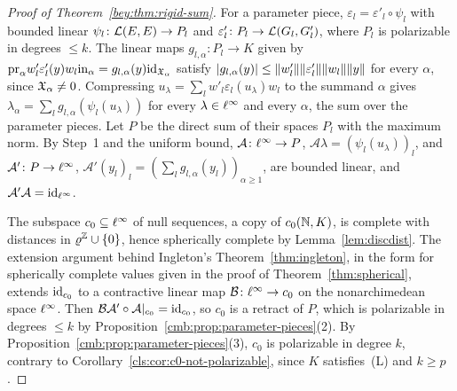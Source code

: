 \begin{proof}[Proof of Theorem~\textup{\ref{bey:thm:rigid-sum}}]
For a parameter piece, $\varepsilon_l=\varepsilon'_l\circ\psi_l$ with bounded linear $\psi_l\colon\mathcal L(E,E)\to P_l$ and
$\varepsilon'_l\colon P_l\to\mathcal L(G_l,G'_l)$, where $P_l$ is polarizable in degrees $\le k$. The linear maps
$g_{l,\alpha}\colon P_l\to K$ given by
$\mathrm{pr}_\alpha w'_l\varepsilon'_l(y)w_l\mathrm{in}_\alpha=g_{l,\alpha}(y)\mathrm{id}_{\mathfrak X_\alpha}$ satisfy
$\lvert g_{l,\alpha}(y)\rvert\le\lVert w'_l\rVert\lVert \varepsilon'_l\rVert\lVert w_l\rVert\lVert y\rVert$ for every $\alpha$, since $\mathfrak X_\alpha\ne0$.
Compressing $u_\lambda=\sum_lw'_l\varepsilon_l(u_\lambda)w_l$ to the summand $\alpha$ gives
$\lambda_\alpha=\sum_lg_{l,\alpha}(\psi_l(u_\lambda))$ for every $\lambda\in\ell^\infty$ and every $\alpha$, the sum over the
parameter pieces. Let $P$ be the direct sum of their spaces $P_l$ with the maximum norm. By Step~1 and the uniform
bound, $\mathcal A\colon\ell^\infty\to P$, $\mathcal A\lambda=(\psi_l(u_\lambda))_l$, and $\mathcal A'\colon P\to\ell^\infty$,
$\mathcal A'(y_l)_l=(\sum_lg_{l,\alpha}(y_l))_{\alpha\ge1}$, are bounded linear, and $\mathcal A'\mathcal A=\mathrm{id}_{\ell^\infty}$.

The subspace $c_0\subseteq\ell^\infty$ of null sequences, a copy of $c_0(\mathbb N,K)$, is complete with distances in
$\varrho^\mathbb Z\cup\{0\}$, hence spherically complete by Lemma~\ref{lem:discdist}. The extension argument behind Ingleton's
Theorem~\ref{thm:ingleton}, in the form for spherically complete values given in the proof of
Theorem~\ref{thm:spherical}, extends $\mathrm{id}_{c_0}$ to a contractive linear map $\mathcal B\colon\ell^\infty\to c_0$ on the
nonarchimedean space $\ell^\infty$. Then $\mathcal B\mathcal A'\circ\mathcal A|_{c_0}=\mathrm{id}_{c_0}$, so $c_0$ is a retract of
$P$, which is polarizable in degrees $\le k$ by Proposition~\ref{cmb:prop:parameter-pieces}(2). By
Proposition~\ref{cmb:prop:parameter-pieces}(3), $c_0$ is polarizable in degree $k$, contrary to
Corollary~\ref{cls:cor:c0-not-polarizable}, since $K$ satisfies~\textup{(L)} and $k\ge p$.
\end{proof}
